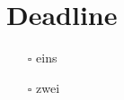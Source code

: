\section*{Deadline}\label{sec:Deadline}

\begin{itemize} 
	\item [$\square$] eins
	\item [$\square$] zwei
\end{itemize}